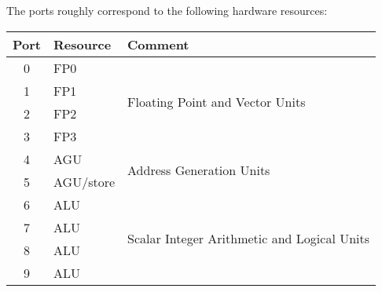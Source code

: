 \documentclass[a4paper,english,fontsize=9]{scrartcl}
\begin{document}
The ports roughly correspond to the following hardware resources:
\begin{center}
    \begin{tabular}{clp{}}
        \toprule
        \textbf{Port} & \textbf{Resource} & \textbf{Comment}\\
        \toprule
        0 & FP0 & \multirow{4}{*}{Floating Point and Vector Units}\\
        1 & FP1 & \\
        2 & FP2 & \\
        3 & FP3 & \\
        4 & AGU & \multirow{2}{*}{Address Generation Units}\\
        5 & AGU/store & \\
        6 & ALU & \multirow{4}{*}{Scalar Integer Arithmetic and Logical Units}\\
        7 & ALU & \\
        8 & ALU & \\
        9 & ALU & \\
        \bottomrule
    \end{tabular}
\end{center}
\end{document}
